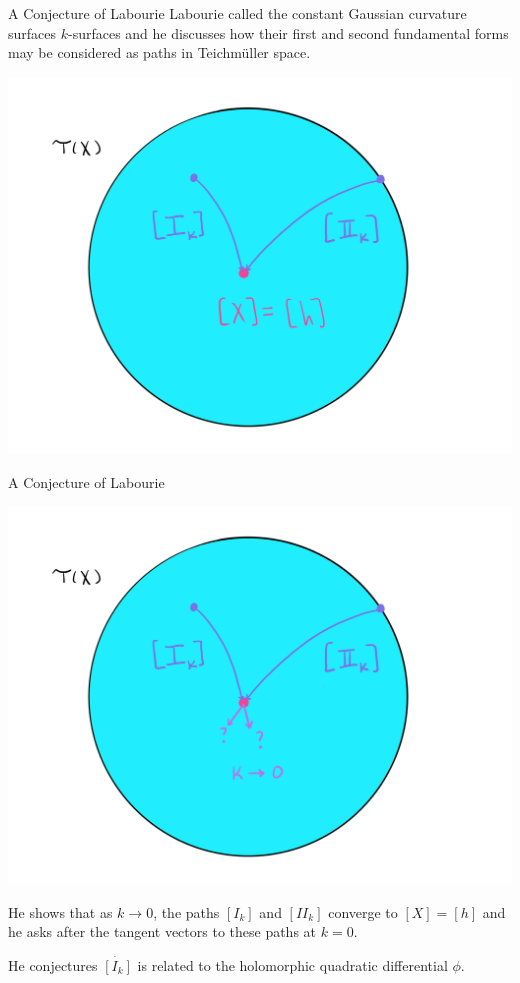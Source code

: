 \documentclass[professionalfont]{beamer}
\newcommand{\two}{I\!I}
\begin{document}


\begin{frame}{A Conjecture of Labourie}
Labourie called the constant Gaussian curvature surfaces $k$-surfaces and he discusses how their first and second fundamental forms may be considered as paths in Teichm\"uller space.

\begin{center}
\includegraphics[scale=0.07]{Teich-paths-1.jpg}
\end{center}


\end{frame}




\begin{frame}{A Conjecture of Labourie}

\vspace{-0.5cm}
\begin{center}
\includegraphics[scale=0.07]{Teich-paths-2.jpg}
\end{center}

\vspace{-0.5cm}
He shows that as $k \to 0$, the paths $[I_k]$ and $[\two_k]$ converge to $[X] = [h]$ and he asks after the tangent vectors to these paths at $k=0$. 
\newline

He conjectures $\dot{[I_k]}$ is related to the holomorphic quadratic differential $\phi$.
\end{frame}
\end{document}
